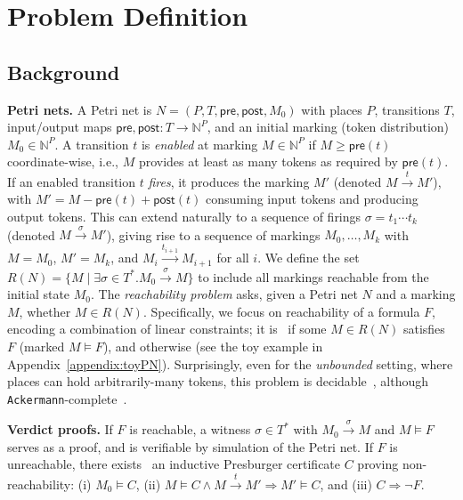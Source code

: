 
\section{Problem Definition}
\label{sec:problem-definition}


\subsection{Background}
\label{subsec:background}

\textbf{Petri nets.} 
A Petri net is $N=(P,T,\mathsf{pre},\mathsf{post},M_0)$ with places $P$, transitions $T$, input/output maps $\mathsf{pre},\mathsf{post}:T\to\mathbb N^P$, and an initial marking (token distribution) $M_0\in\mathbb N^P$.  
A transition $t$ is \textit{enabled} at marking $M \in \mathbb N^P$ if $M\ge \mathsf{pre}(t)$ coordinate-wise, i.e., $M$ provides at least as many tokens as required by $\mathsf{pre}(t)$.
%
If an enabled transition \(t\) \textit{fires}, it produces the marking $M'$ (denoted $M\xrightarrow{t}M'$), with $M'= M - \mathsf{pre}(t) + \mathsf{post}(t)$ consuming input tokens and producing output tokens.
%
This can extend naturally to a sequence of firings $\sigma = t_1\cdots t_k$ (denoted $M \xrightarrow{\sigma} M'$), giving rise to a sequence of markings $M_0,\ldots,M_k$ with $M=M_0$, $M'=M_k$, and $M_i \xrightarrow{t_{i+1}} M_{i+1}$ for all $i$. 
% 
We define the set $R(N)=\{M \mid \exists \sigma\in T^*. M_0 \xrightarrow{\sigma} M\}$ to include all markings reachable from the initial state $M_0$.
% 
The \textit{reachability problem} asks, given a Petri net $N$ and a marking $M$, whether $M\in R(N)$. 
%
Specifically, we focus on reachability of a formula $F$, encoding a combination of linear constraints; it is \sat\ if some $M\in R(N)$ satisfies $F$ (marked $M \models F$), and otherwise \unsat{} (see the toy example in 	Appendix~\ref{appendix:toyPN}).
%
Surprisingly, even for the \textit{unbounded} setting, where places can hold arbitrarily-many tokens, this problem is decidable~\cite{Ma81,Ko82,La92}, although \texttt{Ackermann}-complete~\cite{CzWo22,Le22}.   



\medskip
\noindent
\textbf{Verdict proofs.} 
If $F$ is reachable, a witness $\sigma\in T^*$ with $M_0\xrightarrow{\sigma}M$ and $M\models F$ serves as a proof, and is verifiable by simulation of the Petri net.  
If $F$ is unreachable, there exists~\cite{Le09} an inductive Presburger certificate $C$ proving non-reachability: 
(i) $M_0\models C$, (ii) $M\models C \wedge M\xrightarrow{t}M'\Rightarrow M'\models C$, and (iii) $C\Rightarrow \neg F$.

